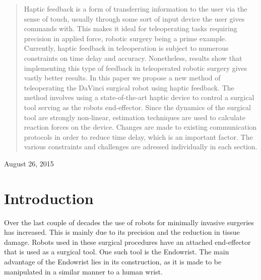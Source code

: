 \documentclass[conference]{IEEEtran}
\begin{document}
\begin{abstract}

Haptic feedback is a form of transferring information to the user via the sense of touch, usually through some sort of input device the user gives commands with.
This makes it ideal for teleoperating tasks requiring precision in applied force, robotic surgery being a prime example.
Currently, haptic feedback in teleoperation is subject to numerous constraints on time delay and accuracy.
Nonetheless, results show that implementing this type of feedback in teleoperated robotic surgery gives vastly better results.
In this paper we propose a new method of teleoperating the DaVinci surgical robot using haptic feedback.
The method involves using a state-of-the-art haptic device to control a surgical tool serving as the robots end-effector.
Since the dynamics of the surgical tool are strongly non-linear, estimation techniques are used to calculate reaction forces on the device.
Changes are made to existing communication protocols in order to reduce time delay, which is an important factor.
The various constraints and challenges are adressed individually in each section. 
\end{abstract}
\hfill August 26, 2015

\printnomenclature

%
\IEEEpeerreviewmaketitle

\section{Introduction}
Over the last couple of decades the use of robots for minimally invasive surgeries has increased.
This is mainly due to its precision and the reduction in tissue damage\cite{RIGSP}.
Robots used in these surgical procedures have an attached end-effector that is used as a surgical tool.
One such tool is the Endowrist. 
The main advantage of the Endowrist lies in its construction, as it is made to be manipulated in a similar manner to a human wrist.
\end{document}
